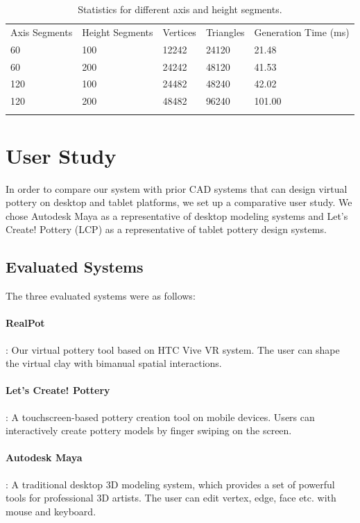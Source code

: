 \documentclass{svjour3}                     %
\begin{document}
\begin{table}
\caption{Statistics for different axis and height segments.}
\label{tab:2}       %
\begin{tabular}{lllll}
\hline\noalign{\smallskip}
Axis Segments & Height Segments & Vertices & Triangles & Generation Time (ms)\\
\noalign{\smallskip}\hline\noalign{\smallskip}
60 & 100 & 12242 & 24120 & 21.48 \\
60 & 200 & 24242 & 48120 & 41.53 \\
120 & 100 & 24482 & 48240 & 42.02 \\
120 & 200 & 48482 & 96240 & 101.00 \\
\noalign{\smallskip}\hline
\end{tabular}
\end{table}

\section{User Study}
\label{sec:6}
In order to compare our system with prior CAD systems that can design virtual pottery on desktop and tablet platforms, we set up a comparative user study. We chose Autodesk Maya \cite{website:maya} as a representative of desktop modeling systems and Let's Create! Pottery (LCP) \cite{website:letspottery} as a representative of tablet pottery design systems.


\subsection{Evaluated Systems}
\label{sec:6.1}
The three evaluated systems were as follows:

\paragraph{RealPot}: Our virtual pottery tool based on HTC Vive VR system. The user can shape the virtual clay with bimanual spatial interactions.
\paragraph{Let’s Create! Pottery}: A touchscreen-based pottery creation tool on mobile devices. Users can interactively create pottery models by finger swiping on the screen.
\paragraph{Autodesk Maya}: A traditional desktop 3D modeling system, which provides a set of powerful tools for professional 3D artists. The user can edit vertex, edge, face etc. with mouse and keyboard.
\end{document}
